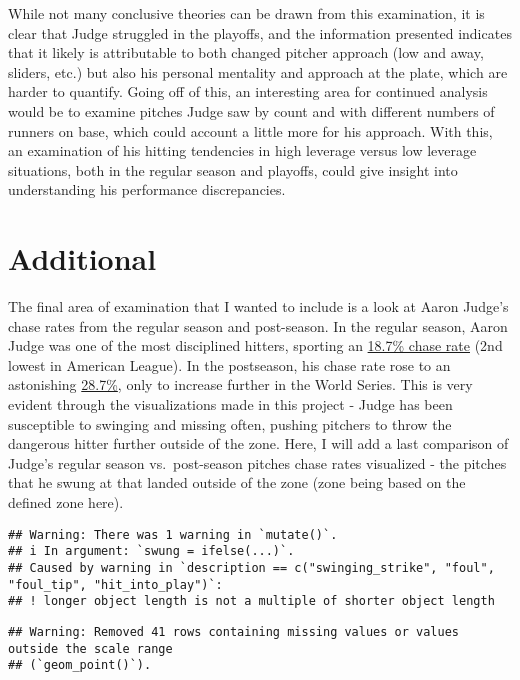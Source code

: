 \documentclass[
]{article}
\begin{document}
While not many conclusive theories can be drawn from this examination,
it is clear that Judge struggled in the playoffs, and the information
presented indicates that it likely is attributable to both changed
pitcher approach (low and away, sliders, etc.) but also his personal
mentality and approach at the plate, which are harder to quantify. Going
off of this, an interesting area for continued analysis would be to
examine pitches Judge saw by count and with different numbers of runners
on base, which could account a little more for his approach. With this,
an examination of his hitting tendencies in high leverage versus low
leverage situations, both in the regular season and playoffs, could give
insight into understanding his performance discrepancies.

\section{Additional}\label{additional}

The final area of examination that I wanted to include is a look at
Aaron Judge's chase rates from the regular season and post-season. In
the regular season, Aaron Judge was one of the most disciplined hitters,
sporting an
\href{https://www.mlb.com/news/aaron-judge-yankees-scuffle-2024-world-series}{18.7\%
chase rate} (2nd lowest in American League). In the postseason, his
chase rate rose to an astonishing
\href{https://www.mlb.com/news/aaron-judge-yankees-scuffle-2024-world-series}{28.7\%},
only to increase further in the World Series. This is very evident
through the visualizations made in this project - Judge has been
susceptible to swinging and missing often, pushing pitchers to throw the
dangerous hitter further outside of the zone. Here, I will add a last
comparison of Judge's regular season vs.~post-season pitches chase rates
visualized - the pitches that he swung at that landed outside of the
zone (zone being based on the defined zone here).

\begin{verbatim}
## Warning: There was 1 warning in `mutate()`.
## i In argument: `swung = ifelse(...)`.
## Caused by warning in `description == c("swinging_strike", "foul", "foul_tip", "hit_into_play")`:
## ! longer object length is not a multiple of shorter object length
\end{verbatim}

\begin{verbatim}
## Warning: Removed 41 rows containing missing values or values outside the scale range
## (`geom_point()`).
\end{verbatim}
\end{document}
